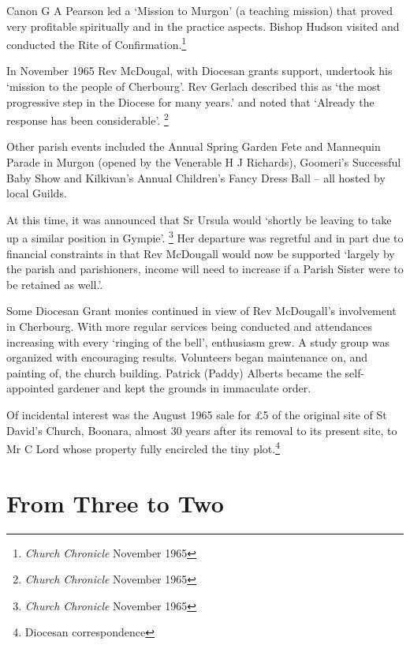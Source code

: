 Canon G A Pearson led a `Mission to Murgon' (a teaching mission) that proved very profitable spiritually and in the practice aspects. Bishop Hudson visited and conducted the Rite of Confirmation.\footnote{\emph{Church Chronicle} November 1965}


In November 1965 Rev McDougal, with Diocesan grants support, undertook his `mission to the people of Cherbourg'. Rev Gerlach described this as `the most progressive step in the Diocese for many years.' and noted that `Already the response has been considerable'. \footnote{\emph{Church Chronicle} November 1965}


Other parish events included the Annual Spring Garden Fete and Mannequin Parade in Murgon (opened by the Venerable H J Richards), Goomeri's Successful Baby Show and Kilkivan's Annual Children's Fancy Dress Ball -- all hosted by local Guilds.



At this time, it was announced that Sr Ursula would `shortly be leaving to take up a similar position in Gympie'. \footnote{\emph{Church Chronicle} November 1965} Her departure was regretful and in part due to financial constraints in that Rev McDougall would now be supported `largely by the parish and parishioners, income will need to increase if a Parish Sister were to be retained as well.'.


Some Diocesan Grant monies continued in view of Rev McDougall's involvement in Cherbourg. With more regular services being conducted and attendances increasing with every `ringing of the bell', enthusiasm grew. A study group was organized with encouraging results. Volunteers began maintenance on, and painting of, the church building. Patrick (Paddy) Alberts became the self-appointed gardener and kept the grounds in immaculate order.



Of incidental interest was the August 1965 sale for \pounds5 of the original site of St David's Church, Boonara, almost 30 years after its removal to its present site, to Mr C Lord whose property fully encircled the tiny plot.\footnote{Diocesan correspondence}


\section{From Three to Two}



